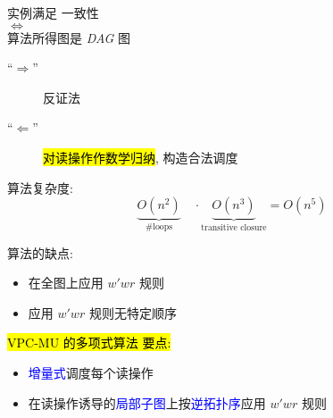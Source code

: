 \begin{frame}{}
  \begin{ctheorem}
    \begin{center}
      \emph{} 实例满足 \emph{\PRAM{}} 一致性 \\[5pt]
      $\iff$ \\[5pt]
      \rwclosure{} 算法所得图是 \emph{DAG} 图
    \end{center}
  \end{ctheorem}

  \pause
  \vspace{0.20cm}

  \begin{cproof}
    \begin{description}
      \item[``$\Longrightarrow$''] 反证法
      \item[``$\Longleftarrow$''] \hl{对读操作作数学归纳}, 构造合法调度
    \end{description}
  \end{cproof}

  \pause
  \vspace{0.50cm}
  \rwclosure{} 算法复杂度: 
  \[
    \underbrace{O(n^2)}_{\textrm{\#loops}} \quad\cdot
	\underbrace{O(n^3)}_{\textrm{transitive closure}}  = O(n^5)
  \]
\end{frame}

\begin{frame}{}
  \rwclosure{} 算法的缺点:
  \begin{itemize}
	\item 在全图上应用 $w'wr$ 规则
	\item 应用 $w'wr$ 规则无特定顺序
  \end{itemize}

  \pause
  \vspace{0.80cm}

  \hl{VPC-MU 的多项式算法 \readcentric{} 要点:}
  \begin{itemize}
    \item \textcolor{blue}{增量式}调度每个读操作
    \item 在读操作诱导的\textcolor{blue}{局部子图}上按\textcolor{blue}{逆拓扑序}应用 $w'wr$ 规则
  \end{itemize}
\end{frame}

